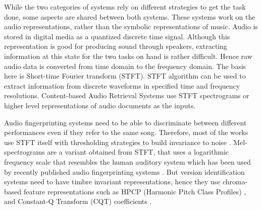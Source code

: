 \documentclass[../main.tex]{subfiles}
\begin{document}
\par
While the two categories of systems rely on different strategies to get the task done, some aspects are shared between both systems. These systems work on the audio representations, rather than the symbolic representations of music. Audio is stored in digital media as a quantized discrete time signal. Although this representation is good for producing sound through speakers, extracting information at this state for the two tasks on hand is rather difficult. Hence raw audio data is converted from time domain to the frequency domain. The basis here is Short-time Fourier transform (\Gls{STFT}).  \Gls{STFT} algorithm can be used to extract information from discrete waveforms in specified time and frequency resolutions. Content-based Audio Retrieval Systems use \gls{STFT} spectrograms or higher level representations of audio documents as the inputs.

\iffalse
Figure \ref{fig:representations} shows some of these representations \cite{book}.

\begin{figure}[H]
    \centering
    \texttt{[image: representations.png]}
    \caption{Various representations for a recording of the chromatic scale played on a real piano. (a) Piano keys representing the chromatic scale. (b) Magnitude spectrogram. (c) Pitch-based log-frequency spectrogram. (d) Chromagram.}
    \label{fig:representations}
\end{figure}
\fi


\par
Audio fingerprinting systems need to be able to discriminate between different performances even if they refer to the same song. Therefore, most of the works use \gls{STFT} itself with thresholding strategies to build invariance to noise \cite{haitsmaHighlyRobustAudio2002,sift,ellisEchoPrintOpenSource2011,wangIndustrialStrengthAudio2003,computer_vision_for_music_identification}. Mel-spectrograms are a variant obtained from \gls{STFT}, that uses a logarithmic frequency scale that resembles the human auditory system which has been used by recently published audio fingerprinting systems \cite{yu_contrastive_2020,baez_suarez_unsupervised_2020}. But version identification systems need to have timbre invariant representations, hence they use chroma-based feature representations such as \gls{HPCP} (Harmonic Pitch Class Profiles) \cite{gomezSongRemainsSame2006,serraChromaBinarySimilarity2008,serraCrossRecurrenceQuantification2009,yesilerAccurateScalableVersion2020}, and Constant-Q Transform (\gls{CQT}) coefficients \cite{yuTemporalPyramidPooling2019,dorasCoverDetectionUsing2019,jiang_yang_chen_2020}.
\end{document}
